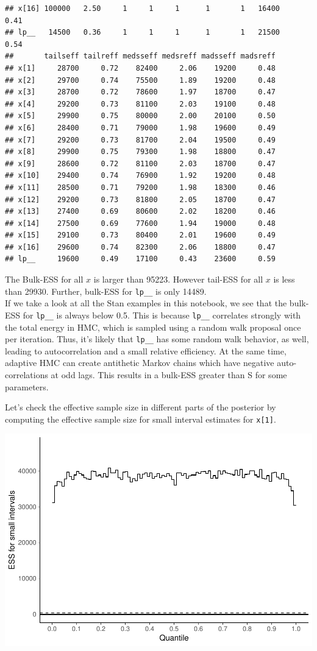 \documentclass[american,]{article}
\begin{document}
\begin{verbatim}
## x[16] 100000   2.50     1     1     1      1       1   16400    0.41
## lp__   14500   0.36     1     1     1      1       1   21500    0.54
##       tailseff tailreff medsseff medsreff madsseff madsreff
## x[1]     28700     0.72    82400     2.06    19200     0.48
## x[2]     29700     0.74    75500     1.89    19200     0.48
## x[3]     28700     0.72    78600     1.97    18700     0.47
## x[4]     29200     0.73    81100     2.03    19100     0.48
## x[5]     29900     0.75    80000     2.00    20100     0.50
## x[6]     28400     0.71    79000     1.98    19600     0.49
## x[7]     29200     0.73    81700     2.04    19500     0.49
## x[8]     29900     0.75    79300     1.98    18800     0.47
## x[9]     28600     0.72    81100     2.03    18700     0.47
## x[10]    29400     0.74    76900     1.92    19200     0.48
## x[11]    28500     0.71    79200     1.98    18300     0.46
## x[12]    29200     0.73    81800     2.05    18700     0.47
## x[13]    27400     0.69    80600     2.02    18200     0.46
## x[14]    27500     0.69    77600     1.94    19000     0.48
## x[15]    29100     0.73    80400     2.01    19600     0.49
## x[16]    29600     0.74    82300     2.06    18800     0.47
## lp__     19600     0.49    17100     0.43    23600     0.59
\end{verbatim}

The Bulk-ESS for all \(x\) is larger than 95223. However tail-ESS for
all \(x\) is less than 29930. Further, bulk-ESS for \texttt{lp\_\_} is
only 14489.\\
If we take a look at all the Stan examples in this notebook, we see that
the bulk-ESS for \texttt{lp\_\_} is always below 0.5. This is because
\texttt{lp\_\_} correlates strongly with the total energy in HMC, which
is sampled using a random walk proposal once per iteration. Thus, it's
likely that \texttt{lp\_\_} has some random walk behavior, as well,
leading to autocorrelation and a small relative efficiency. At the same
time, adaptive HMC can create antithetic Markov chains which have
negative auto-correlations at odd lags. This results in a bulk-ESS
greater than S for some parameters.

Let's check the effective sample size in different parts of the
posterior by computing the effective sample size for small interval
estimates for \texttt{x{[}1{]}}.

\includegraphics{graphics/local-ess-fit-n-1.pdf}
\end{document}
